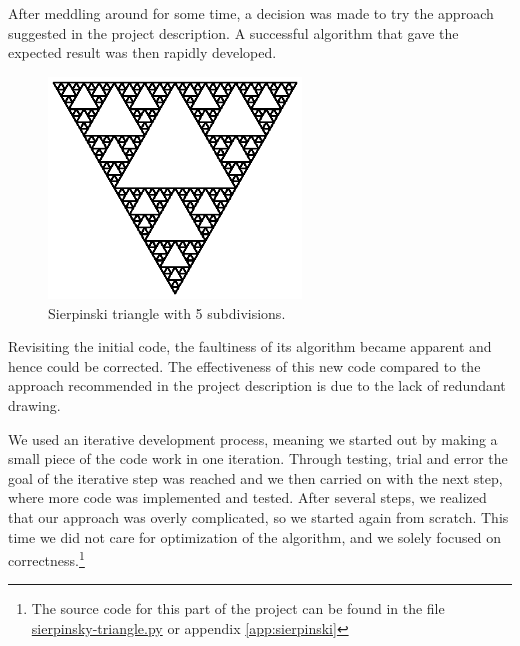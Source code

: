 \documentclass[titlepage]{article}
\begin{document}
After meddling around for some time, a decision was made to try the approach suggested in the project description. A successful algorithm that gave the expected result was then rapidly developed.
\begin{figure}[H]
  
  \includegraphics[width=0.6\textwidth]{triangle}
  \caption{Sierpinski triangle with 5 subdivisions.}
\end{figure}
Revisiting the initial code, the faultiness of its algorithm became apparent and hence could be corrected. The effectiveness of this new code compared to the approach recommended in the project description is due to the lack of redundant drawing. \par We used an iterative development process, meaning we started out by making a small piece of the code work in one iteration. Through testing, trial and error the goal of the iterative step was reached and we then carried on with the next step, where more code was implemented and tested. After several steps, we realized that our approach was overly complicated, so we started again from scratch. This time we did not care for optimization of the algorithm, and we solely focused on correctness.\footnote{The source code for this part of the project can be found in the file \href{https://github.com/ErikAndersen81/DM550-FractalProject/blob/master/sierpinsky-triangle.py}{sierpinsky-triangle.py} or appendix \ref{app:sierpinski}}
\end{document}
